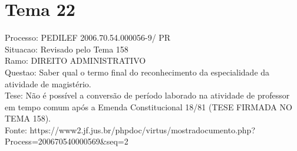 \documentclass[12pt]{article}
\begin{document}
\section*{Tema 22}
Processo: PEDILEF 2006.70.54.000056-9/ PR\\
Situacao: Revisado pelo Tema 158\\
Ramo: DIREITO ADMINISTRATIVO\\
Questao: Saber qual o termo final do reconhecimento da especialidade da atividade de magistério.\\
Tese: Não é possível a conversão de período laborado na atividade de professor em tempo comum após a Emenda Constitucional 18/81 (TESE FIRMADA NO TEMA 158).\\
Fonte: https://www2.jf.jus.br/phpdoc/virtus/mostradocumento.php?Process=200670540000569\&seq=2
\end{document}
